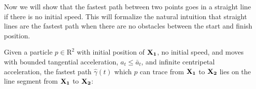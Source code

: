 
Now we will show that the fastest path between two points goes in a straight line if there is no initial speed. This will formalize the natural intuition that straight lines are the fastest path when there are no obstacles between the start and finish position.

\begin{theorem}
  \label{theorem:line-proof}
  Given a particle $p \in \mathrm{R}^2$ with initial position of $\mathbf{X_1}$, no initial speed, and moves with bounded tangential acceleration, $a_t \le \bar{a}_{t}$, and infinite centripetal acceleration, the fastest path $\hat{\gamma}(t)$ which $p$ can trace from $\mathbf{X_1}$ to $\mathbf{X_2}$ lies on the line segment from $\mathbf{X_1}$ to $\mathbf{X_2}$:
\end{theorem}

